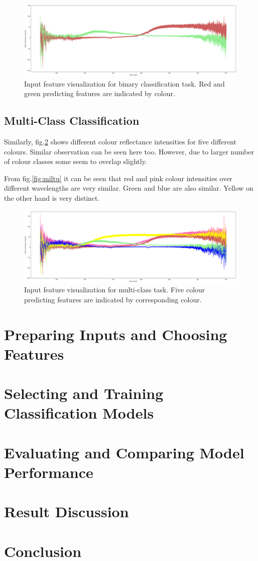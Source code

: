\documentclass[11pt]{article}
\begin{document}
			\begin{figure}[H]
				\includegraphics[width=1\textwidth]{png/binary_default}
				\caption{Input feature visualization for binary classification task. Red and green predicting features are indicated by colour.}
				\label{fig:binary}
			\end{figure}

		\subsection{Multi-Class Classification}

			Similarly, fig.\ref{fig:multi} shows different colour reflectance intensities for five different colours. Similar observation can be seen here too. However, due to larger number of colour classes some seem to overlap slightly. 

			From fig.\ref{fig:miltu} it can be seen that red and pink colour intensities over different wavelengths are very similar. Green and blue are also similar. Yellow on the other hand is very distinct. 

			\begin{figure}[H]
				\includegraphics[width=1\textwidth]{png/multi_default}
				\caption{Input feature visualization for multi-class task. Five colour predicting features are indicated by corresponding colour.}
				\label{fig:multi}
			\end{figure}

	\section{Preparing Inputs and Choosing Features}
	\section{Selecting and Training Classification Models}
	\section{Evaluating and Comparing Model Performance}
	\section{Result Discussion}


	\section{Conclusion}
	
\end{document}
